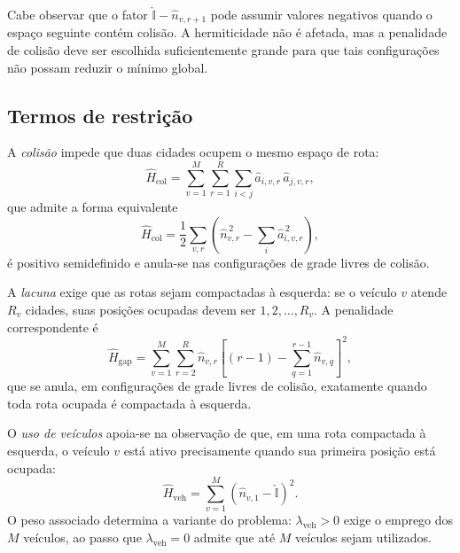         Cabe observar que o fator $\hat{\mathbb{I}} - \hat{n}_{v,r+1}$ pode assumir valores negativos quando o espaço seguinte contém colisão. A hermiticidade não é afetada, mas a penalidade de colisão deve ser escolhida suficientemente grande para que tais configurações não possam reduzir o mínimo global.

    \subsection{Termos de restrição}\label{subsec:form_mod_restricoes}

        A \emph{colisão} impede que duas cidades ocupem o mesmo espaço de rota:
        \begin{equation}\label{eq:form_mod_hcol}
            \hat{H}_{\text{col}} = \sum_{v=1}^{M} \sum_{r=1}^{R} \sum_{i<j}
            \hat{a}_{i,v,r}\, \hat{a}_{j,v,r} ,
        \end{equation}
        \noindent que admite a forma equivalente
        \begin{equation}\label{eq:form_mod_hcol_alt}
            \hat{H}_{\text{col}} = \frac{1}{2} \sum_{v,r}
            \left( \hat{n}_{v,r}^{\,2} - \sum_{i} \hat{a}_{i,v,r}^{\,2} \right) ,
        \end{equation}
        \noindent é positivo semidefinido e anula-se nas configurações de grade livres de colisão.

        A \emph{lacuna} exige que as rotas sejam compactadas à esquerda: se o veículo $v$ atende $R_v$ cidades, suas posições ocupadas devem ser $1, 2, \dots, R_v$. A penalidade correspondente é
        \begin{equation}\label{eq:form_mod_hgap}
            \hat{H}_{\text{gap}} = \sum_{v=1}^{M} \sum_{r=2}^{R}
            \hat{n}_{v,r} \left[ (r-1) - \sum_{q=1}^{r-1} \hat{n}_{v,q} \right]^2 ,
        \end{equation}
        \noindent que se anula, em configurações de grade livres de colisão, exatamente quando toda rota ocupada é compactada à esquerda.

        O \emph{uso de veículos} apoia-se na observação de que, em uma rota compactada à esquerda, o veículo $v$ está ativo precisamente quando sua primeira posição está ocupada:
        \begin{equation}\label{eq:form_mod_hveh}
            \hat{H}_{\text{veh}} = \sum_{v=1}^{M} \left( \hat{n}_{v,1} - \hat{\mathbb{I}} \right)^2 .
        \end{equation}
        \noindent O peso associado determina a variante do problema: $\lambda_{\text{veh}} > 0$ exige o emprego dos $M$ veículos, ao passo que $\lambda_{\text{veh}} = 0$ admite que até $M$ veículos sejam utilizados.

